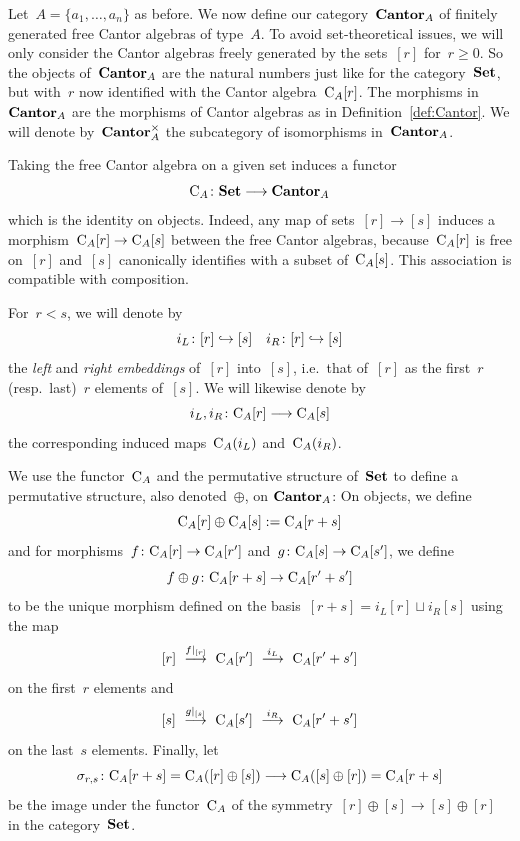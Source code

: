 Let~$A=\{a_1,\dots,a_n\}$ as before. 
We now define our category~$\mathbf{Cantor}_A$ of finitely generated free Cantor algebras of type~$A$.  
To avoid set-theoretical issues, we will only consider the Cantor algebras freely generated by the sets~$[r]$ for~$r\ge 0$. So the objects of~$\mathbf{Cantor}_A$ are the natural numbers just like for the category~$\mathbf{Set}$, but with~$r$ now identified with the Cantor algebra~$\mathrm{C}_A[r]$. The morphisms in~$\mathbf{Cantor}_A$ are the morphisms of Cantor algebras as in Definition~\ref{def:Cantor}. We will denote by~$\mathbf{Cantor}_A^\times$ the subcategory  of isomorphisms in~$\mathbf{Cantor}_A$. 


Taking the free Cantor algebra on a given set induces a  functor 
$$\mathrm{C}_A\colon\mathbf{Set}\longrightarrow \mathbf{Cantor}_A$$
which is the identity on objects.
Indeed, any map of sets~$[r]\to [s]$ induces a morphism~\hbox{$\mathrm{C}_A[r]\to \mathrm{C}_A[s]$} between the free Cantor algebras, because~$\mathrm{C}_A[r]$ is free on~$[r]$ and~$[s]$ canonically identifies with a subset of~$\mathrm{C}_A[s]$. This association is compatible with composition. 

\begin{Def}
For~$r<s$, we will denote by 
$$i_L\colon[r]\inc [s] \ \ \ i_R\colon[r]\inc [s]$$
the {\em left} and {\em right embeddings} of~$[r]$ into~$[s]$, i.e.~that  of~$[r]$ as the first~$r$ (resp.~last)~$r$ elements of~$[s]$. We will likewise denote by 
$$i_L,i_R\colon \mathrm{C}_A[r] \longrightarrow \mathrm{C}_A[s]$$
the corresponding induced maps~$\mathrm{C}_A(i_L)$ and~$\mathrm{C}_A(i_R)$. 
\end{Def}

We use the functor~$\mathrm{C}_A$ and the permutative structure of~$\mathbf{Set}$ to define a permutative structure, also denoted~$\oplus$, on 
$\mathbf{Cantor}_A$: 
On objects, we define 
\[
\mathrm{C}_A[r]\oplus \mathrm{C}_{A}[s]:=\mathrm{C}_{A}[r+s]
\]
and for morphisms~$f\colon\mathrm{C}_A[r]\to \mathrm{C}_A[r']$ and~$g\colon\mathrm{C}_A[s]\to \mathrm{C}_A[s']$, we define~$$f\oplus g\colon\mathrm{C}_A[r+s]\to \mathrm{C}_A[r'+s']$$  
to be the unique morphism defined on the basis~$[r+s]=i_L[r]\sqcup i_R[s]$ using the map 
$$[r]\ \stackrel{f|_{[r]}}{\longrightarrow} \ \mathrm{C}_A[r']\ \stackrel{i_L}{\longrightarrow} \ \mathrm{C}_A[r'+s']$$ on the first~$r$ elements and
$$[s]\ \stackrel{g|_{[s]}}\rar\  \rmC_A[s']\ \stackrel{i_R} \rar \ \rmC_A[r'+s']$$ on the last~$s$ elements. 
Finally, let 
\[
\sigma_{r,s}\colon\mathrm{C}_A[r+s]=\mathrm{C}_A([r]\oplus [s])\longrightarrow \mathrm{C}_A([s]\oplus [r])=\mathrm{C}_A[r+s]
\] 
be the image under the functor~$\mathrm{C}_A$ of the symmetry~$[r]\oplus [s]\to [s]\oplus [r]$ in the category~$\mathbf{Set}$.



